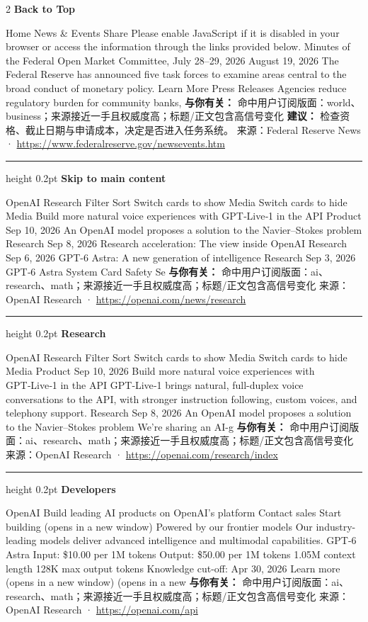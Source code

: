 \documentclass[10.5pt]{ctexart}
\begin{document}
\begin{multicols}{2}
{\large\bfseries Back to Top}\par
Home News \& Events Share Please enable JavaScript if it is disabled in your browser or access the information through the links provided below. Minutes of the Federal Open Market Committee, July 28–29, 2026 August 19, 2026 The Federal Reserve has announced five task forces to examine areas central to the broad conduct of monetary policy. Learn More Press Releases Agencies reduce regulatory burden for community banks,
\textbf{与你有关：} 命中用户订阅版面：world、business；来源接近一手且权威度高；标题/正文包含高信号变化
\textbf{建议：} 检查资格、截止日期与申请成本，决定是否进入任务系统。
{\footnotesize\color{ormuted} 来源：Federal Reserve News · \url{https://www.federalreserve.gov/newsevents.htm}}
\vspace{2mm}
\hrule height 0.2pt
\vspace{2mm}
{\large\bfseries Skip to main content}\par
OpenAI Research Filter Sort Switch cards to show Media Switch cards to hide Media Build more natural voice experiences with GPT‑Live‑1 in the API Product Sep 10, 2026 An OpenAI model proposes a solution to the Navier–Stokes problem Research Sep 8, 2026 Research acceleration: The view inside OpenAI Research Sep 6, 2026 GPT-6 Astra: A new generation of intelligence Research Sep 3, 2026 GPT‑6 Astra System Card Safety Se
\textbf{与你有关：} 命中用户订阅版面：ai、research、math；来源接近一手且权威度高；标题/正文包含高信号变化
{\footnotesize\color{ormuted} 来源：OpenAI Research · \url{https://openai.com/news/research}}
\vspace{2mm}
\hrule height 0.2pt
\vspace{2mm}
{\large\bfseries Research}\par
OpenAI Research Filter Sort Switch cards to show Media Switch cards to hide Media Product Sep 10, 2026 Build more natural voice experiences with GPT‑Live‑1 in the API GPT‑Live‑1 brings natural, full-duplex voice conversations to the API, with stronger instruction following, custom voices, and telephony support. Research Sep 8, 2026 An OpenAI model proposes a solution to the Navier–Stokes problem We’re sharing an AI-g
\textbf{与你有关：} 命中用户订阅版面：ai、research、math；来源接近一手且权威度高；标题/正文包含高信号变化
{\footnotesize\color{ormuted} 来源：OpenAI Research · \url{https://openai.com/research/index}}
\vspace{2mm}
\hrule height 0.2pt
\vspace{2mm}
{\large\bfseries Developers}\par
OpenAI Build leading AI products on OpenAI’s platform Contact sales Start building (opens in a new window) Powered by our frontier models Our industry-leading models deliver advanced intelligence and multimodal capabilities. GPT-6 Astra Input: \$10.00 per 1M tokens Output: \$50.00 per 1M tokens 1.05M context length 128K max output tokens Knowledge cut-off: Apr 30, 2026 Learn more (opens in a new window) (opens in a new
\textbf{与你有关：} 命中用户订阅版面：ai、research、math；来源接近一手且权威度高；标题/正文包含高信号变化
{\footnotesize\color{ormuted} 来源：OpenAI Research · \url{https://openai.com/api}}
\end{multicols}
\end{document}
